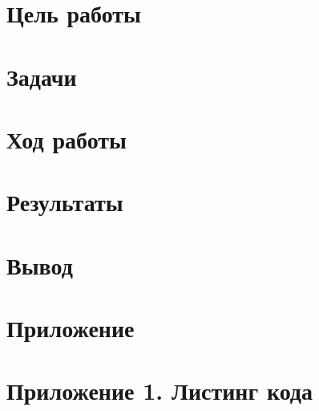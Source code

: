\documentclass[tikz,nohypdvips, 12pt]{article}
\begin{document}
	
	\maketitle
	\restoregeometry
	\addtocounter{page}{1}
	\section*{Цель работы}
	\section*{Задачи}

	\newpage
	\section*{Ход работы}

	\maintext
	

	\newpage
	\section*{Результаты}
	\section*{Вывод}
	\newpage
	\section*{Приложение}\label{sec:apendix}
	
	\section*{Приложение 1. Листинг кода}
	
\end{document}
